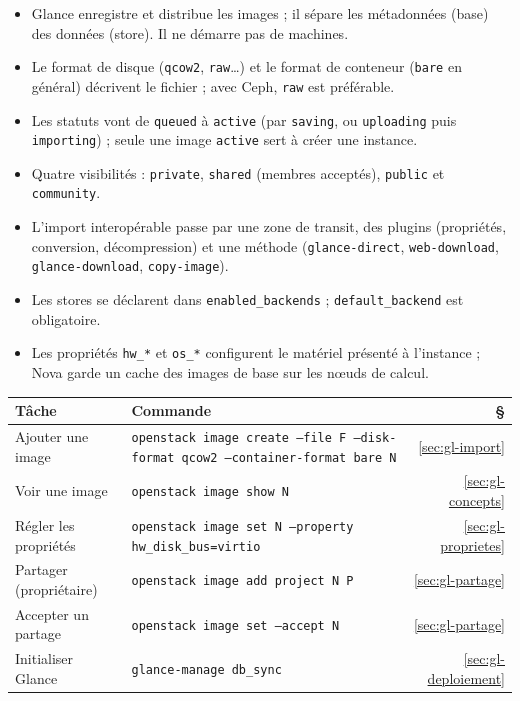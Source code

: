 \begin{aretenir}
\begin{itemize}
  \item Glance enregistre et distribue les images ; il sépare les métadonnées (base) des données (store). Il ne
        démarre pas de machines.
  \item Le format de disque (\texttt{qcow2}, \texttt{raw}\dots) et le format de conteneur (\texttt{bare} en général) décrivent le
        fichier ; avec Ceph, \texttt{raw} est préférable.
  \item Les statuts vont de \texttt{queued} à \texttt{active} (par \texttt{saving}, ou \texttt{uploading} puis \texttt{importing}) ; seule une
        image \texttt{active} sert à créer une instance.
  \item Quatre visibilités : \texttt{private}, \texttt{shared} (membres acceptés), \texttt{public} et \texttt{community}.
  \item L'import interopérable passe par une zone de transit, des plugins (propriétés, conversion, décompression) et une
        méthode (\texttt{glance-direct}, \texttt{web-download}, \texttt{glance-download}, \texttt{copy-image}).
  \item Les stores se déclarent dans \texttt{enabled\_backends} ; \texttt{default\_backend} est obligatoire.
  \item Les propriétés \texttt{hw\_*} et \texttt{os\_*} configurent le matériel présenté à l'instance ; Nova garde un cache
        des images de base sur les nœuds de calcul.
\end{itemize}
\end{aretenir}

\begin{center}
\renewcommand{\arraystretch}{1.35}
\begin{tabular}{@{}>{\raggedright\arraybackslash}p{4.2cm}>{\raggedright\arraybackslash}p{9.9cm}r@{}}
\toprule
\textbf{Tâche} & \textbf{Commande} & \textbf{§} \\
\midrule
Ajouter une image & \texttt{openstack image create --file F --disk-format qcow2 --container-format bare N} & \ref{sec:gl-import} \\
Voir une image & \texttt{openstack image show N} & \ref{sec:gl-concepts} \\
Régler les propriétés & \texttt{openstack image set N --property hw\_disk\_bus=virtio} & \ref{sec:gl-proprietes} \\
Partager (propriétaire) & \texttt{openstack image add project N P} & \ref{sec:gl-partage} \\
Accepter un partage & \texttt{openstack image set --accept N} & \ref{sec:gl-partage} \\
Initialiser Glance & \texttt{glance-manage db\_sync} & \ref{sec:gl-deploiement} \\
\bottomrule
\end{tabular}
\end{center}

